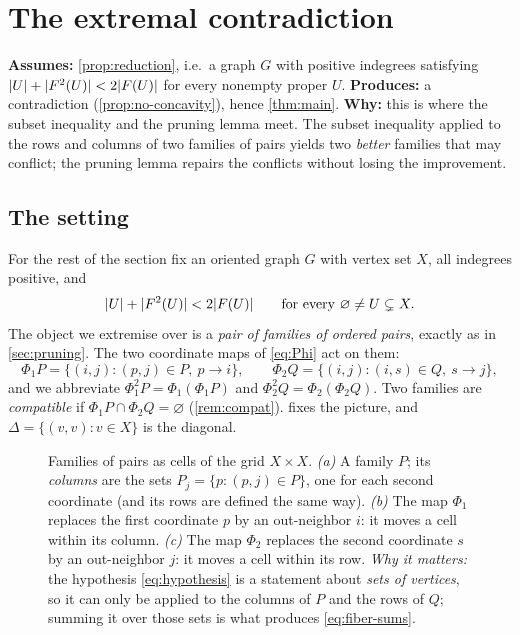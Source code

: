 \section{The extremal contradiction}\label{sec:incompatibility}

\begin{contract}
\textbf{Assumes:} \cref{prop:reduction}, i.e.\ a graph $G$ with positive indegrees satisfying
$\lvert U\rvert+\lvert F^2(U)\rvert<2\lvert F(U)\rvert$ for every nonempty proper $U$. \quad
\textbf{Produces:} a contradiction (\cref{prop:no-concavity}), hence \cref{thm:main}.
\textbf{Why:} this is where the subset inequality and the pruning lemma meet. The subset inequality
applied to the rows and columns of two families of pairs yields two \emph{better} families that may
conflict; the pruning lemma repairs the conflicts without losing the improvement.
\end{contract}

\subsection{The setting}\label{sec:setting}

For the rest of the section fix an oriented graph $G$ with vertex set $X$, all indegrees positive,
and
\begin{equation}\label{eq:hypothesis}
 \lvert U\rvert+\lvert F^2(U)\rvert<2\lvert F(U)\rvert
 \qquad\text{for every }\varnothing\ne U\subsetneq X .
\end{equation}
The object we extremise over is a \emph{pair of families of ordered pairs}, exactly as in
\cref{sec:pruning}. The two coordinate maps of \eqref{eq:Phi} act on them:
\begin{equation}\label{eq:Phi-again}
 \Phi_1 P=\{(i,j):(p,j)\in P,\ p\to i\},\qquad
 \Phi_2 Q=\{(i,j):(i,s)\in Q,\ s\to j\},
\end{equation}
and we abbreviate $\Phi_1^2P=\Phi_1(\Phi_1P)$ and $\Phi_2^2Q=\Phi_2(\Phi_2Q)$. Two families are
\emph{compatible} if $\Phi_1P\cap\Phi_2Q=\varnothing$ (\cref{rem:compat}).  fixes the
picture, and $\Delta=\{(v,v):v\in X\}$ is the diagonal.

\begin{figure}[t]
\centering

\caption{Families of pairs as cells of the grid $X\times X$. \emph{(a)} A family $P$; its
 \emph{columns} are the sets $P_j=\{p:(p,j)\in P\}$, one for each second coordinate (and its rows are
 defined the same way). \emph{(b)} The map $\Phi_1$ replaces the first coordinate $p$ by an
 out-neighbor $i$: it moves a cell within its column. \emph{(c)} The map $\Phi_2$ replaces the second
 coordinate $s$ by an out-neighbor $j$: it moves a cell within its row. \emph{Why it matters:} the
 hypothesis \eqref{eq:hypothesis} is a statement about \emph{sets of vertices}, so it can only be
 applied to the columns of $P$ and the rows of $Q$; summing it over those sets is what produces
 \eqref{eq:fiber-sums}.}
\label{fig:grid}
\end{figure}

